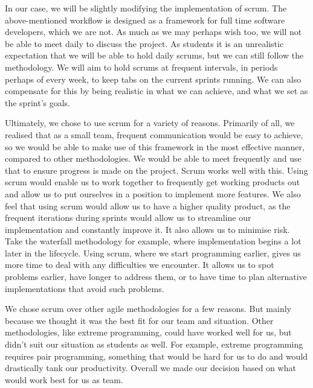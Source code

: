 In our case, we will be slightly modifying the implementation of scrum. The above-mentioned workflow is designed as a framework for full time software developers, which we are not. As much as we may perhaps wish too, we will not be able to meet daily to discuss the project. As students it is an unrealistic expectation that we will be able to hold daily scrums, but we can still follow the methodology. We will aim to hold scrums at frequent intervals, in periods perhaps of every week, to keep tabs on the current sprints running. We can also compensate for this by being realistic in what we can achieve, and what we set as the sprint’s goals. 

Ultimately, we chose to use scrum for a variety of reasons. Primarily of all, we realised that as a small team, frequent communication would be easy to achieve, so we would be able to make use of this framework in the most effective manner, compared to other methodologies. We would be able to meet frequently and use that to ensure progress is made on the project. Scrum works well with this. Using scrum would enable us to work together to frequently get working products out and allow us to put ourselves in a position to implement more features. We also feel that using scrum would allow us to have a higher quality product, as the frequent iterations during sprints would allow us to streamline our implementation and constantly improve it. It also allows us to minimise risk. Take the waterfall methodology for example, where implementation begins a lot later in the lifecycle. Using scrum, where we start programming earlier, gives us more time to deal with any difficulties we encounter. It allows us to spot problems earlier, have longer to address them, or to have time to plan alternative implementations that avoid such problems. 

We chose scrum over other agile methodologies for a few reasons. But mainly because we thought it was the best fit for our team and situation. Other methodologies, like extreme programming, could have worked well for us, but didn’t suit our situation as students as well. For example, extreme programming requires pair programming, something that would be hard for us to do and would drastically tank our productivity. Overall we made our decision based on what would work best for us as  team.
